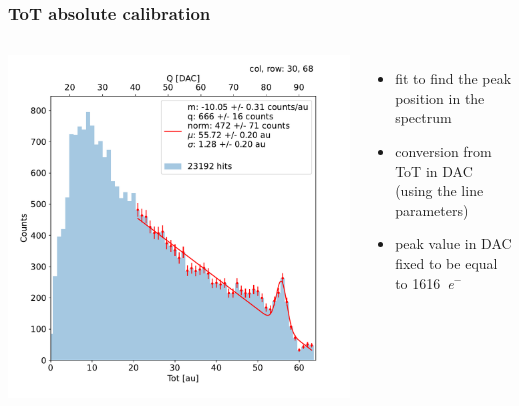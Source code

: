 \begin{frame}
\begin{columns}
        \end{columns}
    \end{frame}    
      

    \begin{frame}
        \frametitle{ToT absolute calibration}
        \begin{columns}
                \includegraphics[width=1.1\linewidth]{figures/charaterization/fit_line_gauss_r69.pdf}
            \begin{itemize}
                \item fit to find the peak position in the spectrum
                \item conversion from ToT in DAC (using the line parameters)
                \item peak value in DAC fixed to be equal to \SI{1616}{\elementarycharge}$^-$
            \end{itemize} 
        \end{columns}
        
    \end{frame}     




